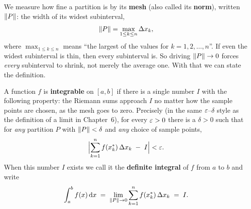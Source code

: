 We measure how fine a partition is by its \textbf{mesh} (also called its
\textbf{norm}), written $\norm{P}$: the width of its widest subinterval,
\[
  \norm{P} = \max_{1 \le k \le n} \Delta x_k,
\]
where $\max_{1 \le k \le n}$ means ``the largest of the values for
$k=1,2,\dots,n$''. If even the widest subinterval is thin, then every
subinterval is. So driving $\norm{P} \to 0$ forces \emph{every} subinterval to
shrink, not merely the average one. With that we can state the definition.

\begin{definition}
\label{ch20:def-definite-integral}
A function $f$ is \textbf{integrable} on $[a,b]$ if there is a single number $I$
with the following property: the Riemann sums approach $I$ no matter how the
sample points are chosen, as the mesh goes to zero. Precisely (in the same
$\eps$--$\delta$ style as the definition of a limit in Chapter~6), for every
$\eps > 0$ there is a $\delta > 0$ such that for \emph{any} partition $P$ with
$\norm{P} < \delta$ and \emph{any} choice of sample points,
\[
  \abs[\Big]{\sum_{k=1}^{n} f(x_k^\ast)\,\Delta x_k \;-\; I} < \eps.
\]
When this number $I$ exists we call it the \textbf{definite integral} of $f$
from $a$ to $b$ and write
\[
  \int_a^b f(x)\,\dd x \;=\; \lim_{\norm{P}\to 0}
      \sum_{k=1}^{n} f(x_k^\ast)\,\Delta x_k \;=\; I.
\]
\end{definition}

